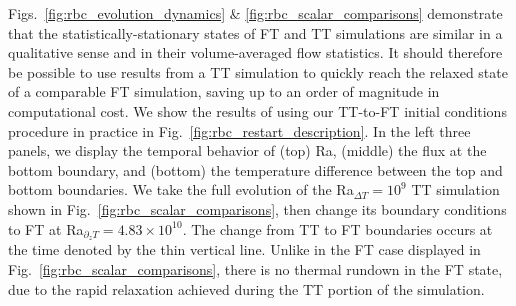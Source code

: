 \documentclass[aps, pre, onecolumn, nofootinbib, notitlepage, groupedaddress, amsfonts, amssymb, amsmath, longbibliography, superscriptaddress]{revtex4-1}
\newcommand{\ea}[1]{{\color{red} #1}}
\begin{document}
\ea{Figs.~\ref{fig:rbc_evolution_dynamics} \& \ref{fig:rbc_scalar_comparisons} demonstrate that the statistically-stationary states of FT and TT simulations are similar in a qualitative sense and in their volume-averaged flow statistics.}
It should therefore be possible to use results from a TT simulation to quickly reach the relaxed state of a comparable FT simulation, saving up to an order of magnitude in computational cost.
We show \ea{the results of using our TT-to-FT initial conditions procedure} in practice in Fig.~\ref{fig:rbc_restart_description}.
In the left three panels, we display the temporal behavior of (top) Ra, (middle) the flux at the bottom boundary, and (bottom) the temperature difference between the top and bottom boundaries.
We take the full evolution of the Ra$_{\Delta T} = 10^9$ TT simulation shown in Fig.~\ref{fig:rbc_scalar_comparisons}, then change its boundary conditions to FT at Ra$_{\partial_z T} = 4.83\times 10^{10}$.
The change from TT to FT boundaries occurs at the time denoted by the thin vertical line.
Unlike in the FT case displayed in Fig.~\ref{fig:rbc_scalar_comparisons}, there is no thermal rundown in the FT state, due to the rapid relaxation achieved during the TT portion of the simulation.
\end{document}
